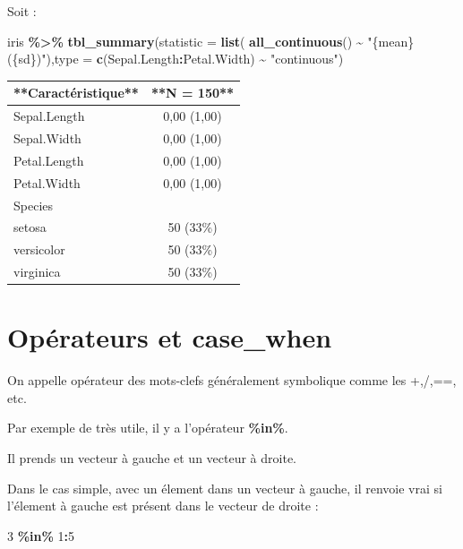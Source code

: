 \documentclass[
]{book}
\newenvironment{Shaded}{\begin{snugshade}}{\end{snugshade}}
\newcommand{\AttributeTok}[1]{\textcolor[rgb]{0.13,0.29,0.53}{#1}}
\newcommand{\DecValTok}[1]{\textcolor[rgb]{0.00,0.00,0.81}{#1}}
\newcommand{\FunctionTok}[1]{\textcolor[rgb]{0.13,0.29,0.53}{\textbf{#1}}}
\newcommand{\NormalTok}[1]{#1}
\newcommand{\SpecialCharTok}[1]{\textcolor[rgb]{0.81,0.36,0.00}{\textbf{#1}}}
\newcommand{\StringTok}[1]{\textcolor[rgb]{0.31,0.60,0.02}{#1}}
\begin{document}
Soit :

\begin{Shaded}
\begin{Highlighting}[]
\NormalTok{iris }\SpecialCharTok{\%\textgreater{}\%} \FunctionTok{tbl\_summary}\NormalTok{(}\AttributeTok{statistic =} \FunctionTok{list}\NormalTok{(}
  \FunctionTok{all\_continuous}\NormalTok{() }\SpecialCharTok{\textasciitilde{}} \StringTok{"\{mean\} (\{sd\})"}\NormalTok{),}\AttributeTok{type =} \FunctionTok{c}\NormalTok{(Sepal.Length}\SpecialCharTok{:}\NormalTok{Petal.Width) }\SpecialCharTok{\textasciitilde{}} \StringTok{"continuous"}\NormalTok{)}
\end{Highlighting}
\end{Shaded}

\begin{tabular}{l|c}
\hline
**Caractéristique** & **N = 150**\\
\hline
Sepal.Length & 0,00 (1,00)\\
\hline
Sepal.Width & 0,00 (1,00)\\
\hline
Petal.Length & 0,00 (1,00)\\
\hline
Petal.Width & 0,00 (1,00)\\
\hline
Species & \\
\hline
setosa & 50 (33\%)\\
\hline
versicolor & 50 (33\%)\\
\hline
virginica & 50 (33\%)\\
\hline
\end{tabular}

\section{Opérateurs et case\_when}\label{opuxe9rateurs-et-case_when}

On appelle opérateur des mots-clefs généralement symbolique comme les +,/,==, etc.

Par exemple de très utile, il y a l'opérateur \textbf{\%in\%}.

Il prends un vecteur à gauche et un vecteur à droite.

Dans le cas simple, avec un élement dans un vecteur à gauche, il renvoie vrai si
l'élement à gauche est présent dans le vecteur de droite :

\begin{Shaded}
\begin{Highlighting}[]
\DecValTok{3} \SpecialCharTok{\%in\%} \DecValTok{1}\SpecialCharTok{:}\DecValTok{5}
\end{Highlighting}
\end{Shaded}
\end{document}
